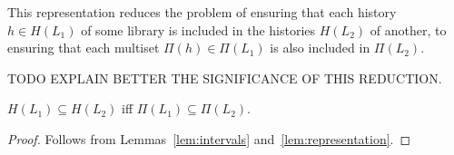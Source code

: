 This representation reduces the problem of ensuring that each history $h \in
H(L_1)$ of some library is included in the histories $H(L_2)$ of another, to
ensuring that each multiset $\Pi(h) \in \Pi(L_1)$ is also included in
$\Pi(L_2)$.

TODO EXPLAIN BETTER THE SIGNIFICANCE OF THIS REDUCTION.

\begin{lemma}

  $H(L_1) \subseteq H(L_2)$ iff $\Pi(L_1) \subseteq \Pi(L_2)$.

\end{lemma}

\begin{proof}

  Follows from Lemmas~\ref{lem:intervals} and~\ref{lem:representation}.

\end{proof}
